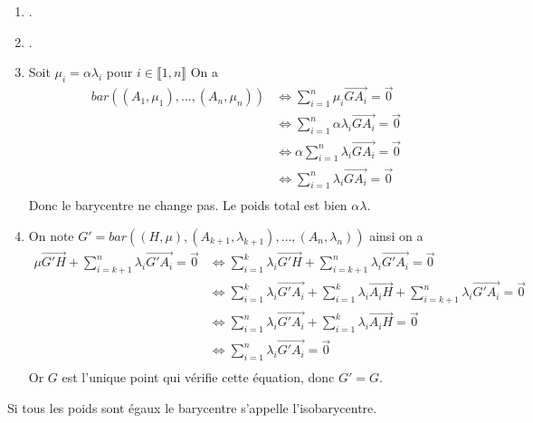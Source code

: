 \documentclass[a4paper,12pt]{article}
\begin{document}
\begin{demonstration}
    \begin{enumerate}[label=\roman*.]
        \item.
        \item.
        \item Soit $\mu_i = \alpha \lambda_i$ pour $i \in \llbracket 1, n \rrbracket$
        On a
        \begin{align*}
            bar((A_1, \mu_1), \ldots, (A_n, \mu_n)) &\iff \sum_{i=1}^n \mu_i \overrightarrow{G A_i} = \vec{0} \\
            &\iff \sum_{i=1}^n \alpha \lambda_i \overrightarrow{G A_i} = \vec{0} \\
            &\iff \alpha \sum_{i=1}^n \lambda_i \overrightarrow{G A_i} = \vec{0} \\
            &\iff \sum_{i=1}^n \lambda_i \overrightarrow{G A_i} = \vec{0} \\
        \end{align*}
        Donc le barycentre ne change pas. Le poids total est bien $\alpha \lambda$.
        \item 
        On note $G' = bar((H, \mu), (A_{k+1}, \lambda_{k+1}), \ldots, (A_n, \lambda_n))$
        ainsi on a
        \begin{align*}
            \mu \overrightarrow{G'H} + \sum_{i=k+1}^n \lambda_i \overrightarrow{G'A_i} = \vec{0} &\iff \sum_{i=1}^k \lambda_i \overrightarrow{G'H} + \sum_{i=k+1}^n \lambda_i \overrightarrow{G'A_i} = \vec{0} \\
            &\iff \sum_{i=1}^k \lambda_i \overrightarrow{G' A_i} + \sum_{i=1}^k \lambda_i \overrightarrow{A_i H} + \sum_{i=k+1}^n \lambda_i \overrightarrow{G'A_i} = \vec{0} \\
            &\iff \sum_{i=1}^n \lambda_i \overrightarrow{G'A_i} + \sum_{i=1}^k \lambda_i \overrightarrow{A_i H} = \vec{0} \\
            &\iff \sum_{i=1}^n \lambda_i \overrightarrow{G'A_i} = \vec{0} \\
        \end{align*}
        Or $G$ est l'unique point qui vérifie cette équation, donc $G' = G$.
    \end{enumerate}
\end{demonstration}

\begin{definition}
    Si tous les poids sont égaux le barycentre s'appelle l'isobarycentre.
\end{definition}
\end{document}
